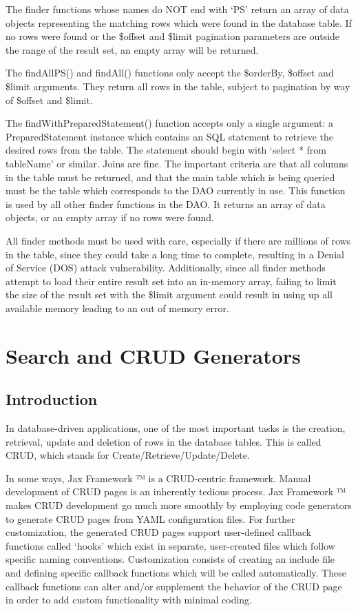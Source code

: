 \documentclass[letterpaper,10pt,english]{sphinxmanual}
\begin{document}
The finder functions whose names do NOT end with `PS' return an array of data objects representing
the matching rows which were found in the database table.  If no rows were found or the \$offset and
\$limit pagination parameters are outside the range of the result set, an empty array will be
returned.

The findAllPS() and findAll() functions only accept the \$orderBy, \$offset and \$limit arguments.
They return all rows in the table, subject to pagination by way of \$offset and \$limit.

The findWithPreparedStatement() function accepts only a single argument: a PreparedStatement
instance which contains an SQL statement to retrieve the desired rows from the table.  The statement
should begin with `select * from tableName' or similar.  Joins are fine.  The important criteria are
that all columns in the table must be returned, and that the main table which is being queried must
be the table which corresponds to the DAO currently in use.  This function is used by all other
finder functions in the DAO.  It returns an array of data objects, or an empty array if no rows were
found.

All finder methods must be used with care, especially if there are millions of rows in the table,
since they could take a long time to complete, resulting in a Denial of Service (DOS) attack
vulnerability.  Additionally, since all finder methods attempt to load their entire result set into
an in-memory array, failing to limit the size of the result set with the \$limit argument could
result in using up all available memory leading to an out of memory error.


\chapter{Search and CRUD Generators}
\label{jaxFrameworkGuide:id18}

\section{Introduction}
\label{jaxFrameworkGuide:id19}
In database-driven applications, one of the most important tasks is the creation, retrieval, update
and deletion of rows in the database tables.  This is called CRUD, which stands for
Create/Retrieve/Update/Delete.

In some ways, Jax Framework ™ is a CRUD-centric framework.  Manual development of CRUD pages
is an inherently tedious process.  Jax Framework ™ makes CRUD development go much more
smoothly by employing code generators to generate CRUD pages from YAML configuration files.  For
further customization, the generated CRUD pages support user-defined callback functions called
`hooks' which exist in separate, user-created files which follow specific naming conventions.
Customization consists of creating an include file and defining specific callback functions which
will be called automatically.  These callback functions can alter and/or supplement the behavior of
the CRUD page in order to add custom functionality with minimal coding.
\end{document}
